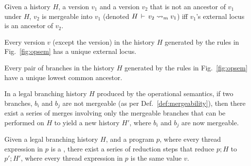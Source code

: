 \begin{definition} 
\label{def:mergeability}
Given a history $H$, a version $v_1$ and a version $v_2$ that is not
an ancestor of $v_1$ under $H$, $v_2$ is mergeable into $v_1$ (denoted
$H\,\vdash\,v_2 \rightsquigarrow_m v_1$) iff $v_1$'s external locus is an
ancestor of $v_2$.
\end{definition}

\begin{lemma} 
Every version $v$ (except the  version) in the history $H$
generated by the rules in Fig.~\ref{fig:opsem} has a unique external
locus.
\end{lemma}

\begin{lemma} 
Every pair of branches in the history $H$ generated by the rules in
Fig.~\ref{fig:opsem} have a unique lowest common ancestor.
\end{lemma}

\begin{lemma} 
In a legal branching history $H$ produced by the operational
semantics, if two branches, $b_i$ and $b_j$ are not mergeable (as per
Def.~\ref{def:mergeability}), then there exist a series of merges
involving only the mergeable branches that can be performed on $H$ to
yield a new history $H'$, where $b_i$ and $b_j$ are now mergeable.
\end{lemma}

\begin{theorem}  Given a
legal branching history $H$, and a program $p$, where every thread
expression in $p$ is a , there exist a series of reduction steps
that reduce $p; H$ to $p'; H'$, where every thread expression in $p$
is the same value $v$.
\end{theorem}


